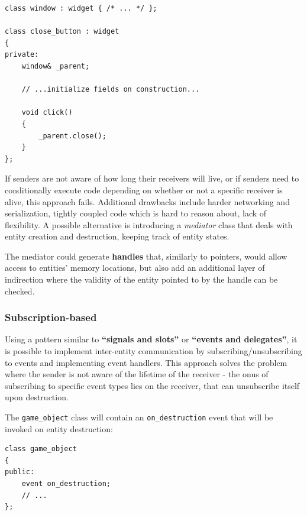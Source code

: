 \documentclass[twoside, 12pt, a4paper, openany]{book}
\begin{document}
\begin{verbatim}
class window : widget { /* ... */ };

class close_button : widget
{
private:
    window& _parent;

    // ...initialize fields on construction...

    void click()
    {
        _parent.close();
    }
};
\end{verbatim}

If senders are not aware of how long their receivers will live, or if
senders need to conditionally execute code depending on whether or not a
specific receiver is alive, this approach fails. Additional drawbacks
include harder networking and serialization, tightly coupled code which
is hard to reason about, lack of flexibility. A possible alternative is
introducing a \emph{mediator} class that deals with entity creation and
destruction, keeping track of entity states.

The mediator could generate \textbf{handles} that, similarly to
pointers, would allow access to entities' memory locations, but also add
an additional layer of indirection where the validity of the entity
pointed to by the handle can be checked.

\subsubsection{Subscription-based}\label{subscription-based}

Using a pattern similar to \textbf{``signals and slots''} or
\textbf{``events and delegates''}, it is possible to implement
inter-entity communication by subscribing/unsubscribing to events and
implementing event handlers. This approach solves the problem where the
sender is not aware of the lifetime of the receiver - the onus of
subscribing to specific event types lies on the receiver, that can
unsubscribe itself upon destruction.

The
\texttt{game_object}
class will contain an
\texttt{on_destruction}
event that will be invoked on entity destruction:

\begin{verbatim}
class game_object
{
public:
    event on_destruction;
    // ...
};
\end{verbatim}
\end{document}
